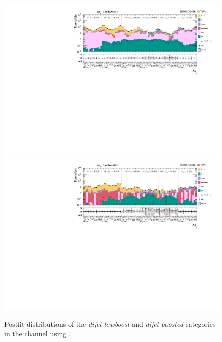 \begin{figure}[h!]
    \centering
        \includegraphics[width=\textwidth]{Figures/statana/Postfit_JEC_jdphi/postfit_fit_s_htt_mt_3_13TeV.pdf}\\
        \includegraphics[width=\textwidth]{Figures/statana/Postfit_JEC_jdphi/postfit_fit_s_htt_mt_4_13TeV.pdf}
    \caption{Postfit distributions of the \textit{dijet lowboost} and \textit{dijet boosted} categories in the \mutau{} channel  using \jdphi{}.}
\end{figure}
\clearpage
